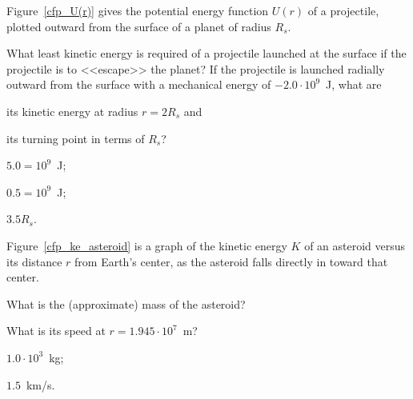 \begin{problem}\label{prb:cfp_least_ke}
	Figure~\ref{cfp_U(r)} gives the potential energy function $U(r)$ of a projectile, plotted outward from the surface of a planet of radius $R_s$. 
	\begin{enumerate*}[label=(\alph*)]
		\item What least kinetic energy is required of a projectile launched at the surface if the projectile is to <<escape>> the planet?
		If the projectile is launched radially outward from the surface with a mechanical energy of $-2.0 \cdot 10^9$~\si{\joule}, what are
		\item its kinetic energy at radius $r = 2R_s$ 
		and
		\item its turning point in terms of $R_s$?
	\end{enumerate*}

	\begin{solution}
		\begin{enumerate*}[label=(\alph*)]
			\item $5.0 = 10^9$~\si{\joule};
			\item $0.5 = 10^9$~\si{\joule};
			\item $3.5R_s$.
		\end{enumerate*}
	\end{solution}
\end{problem}


\begin{problem}\label{prb:cfp_ke_asteroid}
	Figure~\ref{cfp_ke_asteroid} is a graph of the kinetic energy $K$ of an asteroid
	versus its distance $r$ from Earth’s center, as the asteroid falls directly
	in toward that center. 
	\begin{enumerate*}[label=(\alph*)]
		\item What is the (approximate) mass of
		the asteroid?
		\item What is its speed at $r = 1.945 \cdot 10^7$~m?
	\end{enumerate*}
	\begin{solution}
		\begin{enumerate*}[label=(\alph*)]
			\item $1.0 \cdot 10^3$~kg; 
			\item $1.5$~km/s.
		\end{enumerate*}
	\end{solution}
\end{problem}

